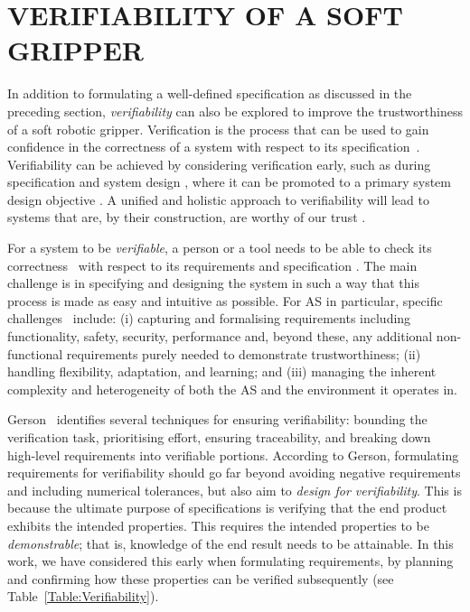 \documentclass[letterpaper, 10 pt, conference]{ieeeconf}  %
\begin{document}
	\section{VERIFIABILITY OF A SOFT GRIPPER} \label{verifiability}
	In addition to formulating a well-defined specification as discussed in the preceding section, \emph{verifiability} can also be explored to improve the trustworthiness of a soft robotic gripper. 
	Verification is the process that can be used to gain confidence in the correctness of a system with respect to its specification~\cite{Bergeron2000}. 
	Verifiability can be achieved by considering verification early, such as during specification and system design \cite{Mousavi2022}, where it can be promoted to a primary system design objective \cite{Eder2021}.
	A unified and holistic approach to verifiability will lead to systems that are, by their construction, are worthy of our trust \cite{Mousavi2022}. 
	
	For a system to be {\em verifiable\/}, a person or a tool needs to be able to check its correctness~\cite{ISO24765:2017} with respect to its requirements and specification \cite{Abeywickrama2022}. 
	The main challenge is in specifying and designing the system in such a way that this process is made as easy and intuitive as possible.
	For AS in particular, specific challenges~\cite{Abeywickrama2022} include: 
	(i) capturing and formalising requirements including functionality, safety, security, performance and, beyond these, any additional non-functional requirements purely needed to demonstrate trustworthiness; 
	(ii) handling flexibility, adaptation, and learning; and 
	(iii) managing the inherent complexity and heterogeneity of both the AS and the environment it operates in. 
	
	Gerson~\cite{Gerson1993} identifies several techniques for ensuring verifiability: bounding the verification task, prioritising effort, ensuring traceability, and breaking down high-level requirements into verifiable portions. 
	According to Gerson, formulating requirements for verifiability should go far beyond avoiding negative requirements and including numerical tolerances, but also aim to \emph{design for verifiability}. 
	This is because the ultimate purpose of specifications is verifying that the end product exhibits the intended properties. 
	This requires the intended properties to be \emph{demonstrable}; that is, knowledge of the end result needs to be attainable. 
	In this work, we have considered this early when formulating requirements, by planning and confirming how these properties can be verified subsequently (see Table~\ref{Table:Verifiability}). 
	
\end{document}
